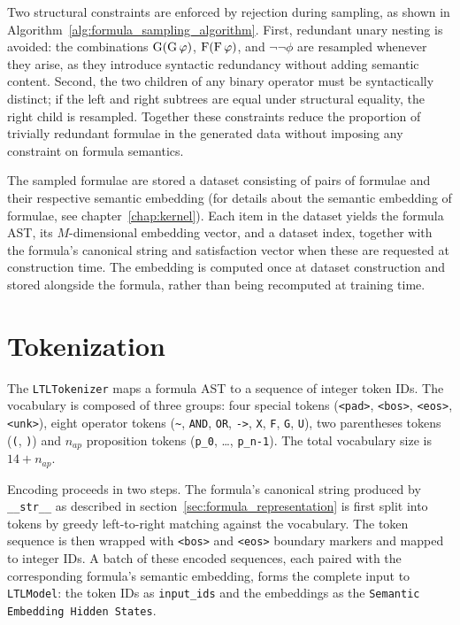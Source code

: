 \documentclass[titlepage,a4paper,11pt]{report}
\begin{document}
    
    Two structural constraints are enforced by rejection during sampling, as shown in Algorithm~\ref{alg:formula_sampling_algorithm}. First, redundant unary nesting is avoided: the combinations $\text{G}(\text{G}\,\varphi)$, $\text{F}(\text{F}\,\varphi)$, and $\neg\neg\phi$ are resampled whenever they arise, as they introduce syntactic redundancy without adding semantic content. Second, the two children of any binary operator must be syntactically distinct; if the left and right subtrees are equal under structural equality, the right child is resampled. Together these constraints reduce the proportion of trivially redundant formulae in the generated data without imposing any constraint on formula semantics.
    
    The sampled formulae are stored a dataset consisting of pairs of formulae and their respective semantic embedding (for details about the semantic embedding of formulae, see chapter~\ref{chap:kernel}). Each item in the dataset yields the formula AST, its $M$-dimensional embedding vector, and a dataset index, together with the formula's canonical string and satisfaction vector when these are requested at construction time. The embedding is computed once at dataset construction and stored alongside the formula, rather than being recomputed at training time.

    \section{Tokenization}
    The \texttt{LTLTokenizer} maps a formula AST to a sequence of integer token IDs. The vocabulary is composed of three groups: four special tokens (\texttt{<pad>}, \texttt{<bos>}, \texttt{<eos>}, \texttt{<unk>}), eight operator tokens (\texttt{\textasciitilde}, \texttt{AND}, \texttt{OR}, \texttt{->}, \texttt{X}, \texttt{F}, \texttt{G}, \texttt{U}), two parentheses tokens (\texttt{(}, \texttt{)}) and $n_{ap}$ proposition tokens (\texttt{p\_0}, \ldots, \texttt{p\_{n-1}}). The total vocabulary size is $14 + n_{ap}$.
    
    Encoding proceeds in two steps. The formula's canonical string produced by \texttt{\_\_str\_\_} as described in section~\ref{sec:formula_representation} is first split into tokens by greedy left-to-right matching against the vocabulary. The token sequence is then wrapped with \texttt{<bos>} and \texttt{<eos>} boundary markers and mapped to integer IDs. A batch of these encoded sequences, each paired with the corresponding formula's semantic embedding, forms the complete input to \texttt{LTLModel}: the token IDs as \texttt{input\_ids} and the embeddings as the \texttt{Semantic Embedding Hidden States}.
\end{document}
